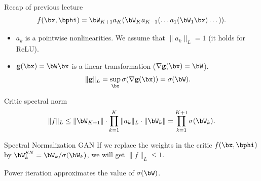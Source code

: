 \begin{frame}{Recap of previous lecture}
	\vspace{-0.3cm}
	\[
		f(\bx, \bphi) = \bW_{K+1} a_K (\bW_K a_{K-1}(\dots a_1(\bW_1 \bx) \dots)).
	\]
	\vspace{-0.3cm}
	\begin{itemize}
		\item $a_k$ is a pointwise nonlinearities. We assume that $\| a_k \|_L = 1$ (it holds for ReLU).
		\item $\mathbf{g}(\bx) = \bW \bx$ is a linear transformation ($\nabla \mathbf{g}(\bx) = \bW$).
		\[
			\| \mathbf{g} \|_L = \sup_\bx \sigma( \nabla \mathbf{g}(\bx)) = \sigma(\bW).
		\]
	\end{itemize}
	\vspace{-0.3cm}
	\begin{block}{Critic spectral norm}
		\vspace{-0.3cm}
		\[
			\| f \|_L \leq \| \bW_{K+1}\| \cdot \prod_{k=1}^K  \| a_k \|_L \cdot \| \bW_k \| = \prod_{k=1}^{K+1} \sigma(\bW_k).
		\]
		\vspace{-0.2cm}
	\end{block}
	\begin{block}{Spectral Normalization GAN}
	If we replace the weights in the critic $f(\bx, \bphi)$ by $\bW^{SN}_k = \bW_k / \sigma(\bW_k)$, we will get $\| f\|_L \leq 1.$ \\
	\end{block}
	 Power iteration approximates the value of $\sigma(\bW)$.
	

\end{frame}
